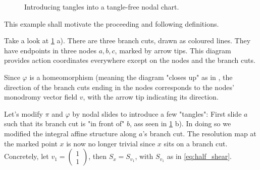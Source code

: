 \documentclass[12pt,a4paper,abstract=true,draft]{scrartcl}
\newcommand\mqty[1]{\begin{pmatrix}#1\end{pmatrix}}
\begin{document}
\begin{example}
\begin{figure}
    \caption{Introducing tangles into a tangle-free nodal chart.}
    \label{fig:building_tangles}
  \end{figure}
  This example shall motivate the proceeding and following definitions.

  Take a look at \cref{fig:building_tangles} a).
  There are three branch cuts, drawn as coloured lines.
  They have endpoints in three nodes $a,b,c$, marked by arrow tips.
  This diagram provides action coordinates everywhere except on the nodes and the branch cuts.

  Since $φ$ is a homeomorphism (meaning the diagram "closes up" as in \cite[Section 7.2]{evans2021atfs}, the direction of the branch cuts ending in the nodes corresponds to the nodes' monodromy vector field $v$, with the arrow tip indicating its direction.


  Let's modify $π$ and $φ$ by nodal slides to introduce a few "tangles": First slide $a$ such that its branch cut is "in front of" $b$, ass seen in \cref{fig:building_tangles} b).
  In doing so we modified the integral affine structure along $a$'s branch cut. 
  The resolution map at the marked point $x$ is now no longer trivial since $x$ sits on a branch cut.
  Concretely, let $v_1 = \mqty{1\\1}$, then $S_x = S_{v_1}$, with $S_{v_1}$ as in \eqref{eq:half_shear}.


\end{example}
\end{document}
